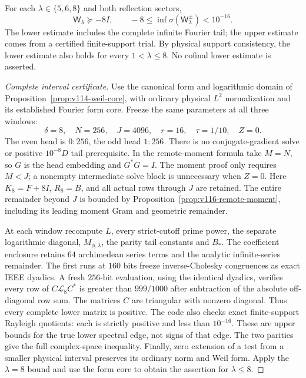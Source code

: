 \begin{proposition}
\label{prop:v138-three-floors}
For each $\lambda\in\{5,6,8\}$ and both reflection sectors,
\begin{equation}\label{eq:v138-three-floors}
 \mathsf W_\lambda\succeq-8I,\qquad
 -8\le\inf\sigma(\mathsf W_\lambda^{\pm})<10^{-16}.
\end{equation}
The lower estimate includes the complete infinite Fourier tail;
the upper estimate comes from a certified finite-support trial.
By physical support consistency, the lower estimate also holds for
every $1<\lambda\le8$. No cofinal lower estimate is asserted.
\end{proposition}
\begin{proof}[Complete interval certificate]
Use the canonical form and logarithmic domain of
Proposition~\ref{prop:v114-weil-core}, with ordinary physical
$L^2$ normalization and its established Fourier form core. Freeze
the same parameters at all three windows:
\[
 \delta=8,\quad N=256,\quad J=4096,\quad r=16,
 \quad\tau=1/10,\quad Z=0.
\]
The even head is $0{:}256$, the odd head $1{:}256$. There is no
conjugate-gradient solve or positive $10^{-8}D$ tail prerequisite.
In the remote-moment formula take $M=N$, so $G$ is the head embedding
and $G^*G=I$. The moment proof only requires $M<J$; a nonempty
intermediate solve block is unnecessary when $Z=0$.
Here $K_8=F+8I$, $R_8=B$, and all actual rows through $J$ are retained.
The entire remainder beyond $J$ is bounded by
Proposition~\ref{prop:v116-remote-moment}, including its leading
moment Gram and geometric remainder.

At each window recompute $L$, every strict-cutoff prime power,
the separate logarithmic diagonal, $M_{\phi,\lambda}$, the parity
tail constants and $B_*$. The coefficient enclosure retains $64$
archimedean series terms and the analytic infinite-series remainder.
The first runs at $160$ bits freeze inverse-Cholesky congruences as
exact IEEE dyadics. A fresh $256$-bit evaluation, using the identical
dyadics, verifies every row of
$C\mathcal L_8C^*$ is greater than $999/1000$ after subtraction
of the absolute off-diagonal row sum. The matrices $C$ are triangular
with nonzero diagonal. Thus every complete lower matrix is positive.
The code also checks exact finite-support Rayleigh quotients: each
is strictly positive and less than $10^{-16}$. These are upper
bounds for the true lower spectral edge, not signs of that edge.
The two parities give the full complex-space inequality.
Finally, zero extension of a test from a smaller physical interval
preserves its ordinary norm and Weil form. Apply the $\lambda=8$
bound and use the form core to obtain the assertion for $\lambda\le8$.
\end{proof}

